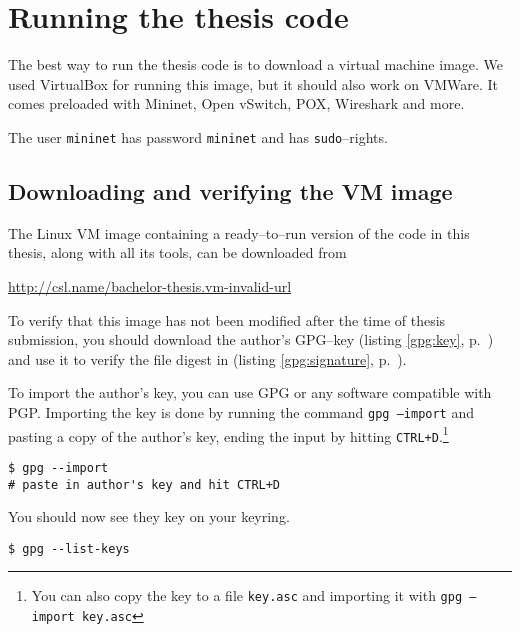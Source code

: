 \chapter{Running the thesis code}
\label{chapter:install.vm}

The best way to run the thesis code is to download a virtual machine image.
We used VirtualBox for running this image, but it should
also work on VMWare.  It comes preloaded with
Mininet, Open vSwitch, POX,
  Wireshark and more.

The user \texttt{mininet} has password \texttt{mininet} and has
\texttt{sudo}--rights.

\section{Downloading and verifying the VM image}

The Linux VM image containing a ready--to--run version of the
code in this thesis, along with all its tools, can be downloaded from
%
\begin{center}
  \href{http://csl.name/bachelor-thesis.vm-invalid-url}{http://csl.name/bachelor-thesis.vm-invalid-url}
  \label{gpg:url}
\end{center}

To verify that this image has not been modified after the time of thesis
submission, you should download the author's GPG--key (listing
\ref{gpg:key}, p.~\pageref{gpg:key}) and use it to verify the file digest
in (listing \ref{gpg:signature}, p.~\pageref{gpg:signature}).

To import the author's key, you can use \ac{GPG} or any software compatible
with PGP.  Importing the key is done by running the command
\texttt{gpg --import} and pasting a copy of the author's key, ending the
input by hitting \texttt{CTRL+D}.\footnote{You can also copy the key to a
  file \texttt{key.asc} and importing it with \texttt{gpg --import key.asc}}

\begin{Verbatim}
$ gpg --import
# paste in author's key and hit CTRL+D
\end{Verbatim}

You should now see they key on your keyring.

\begin{Verbatim}
$ gpg --list-keys
\end{Verbatim}

